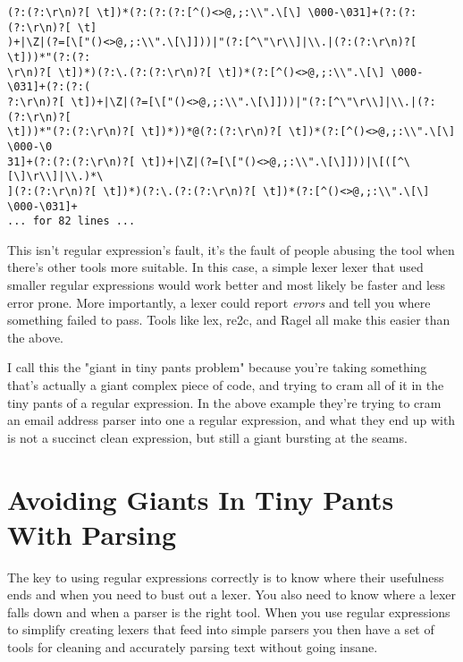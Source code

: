 \begin{lstlisting}
(?:(?:\r\n)?[ \t])*(?:(?:(?:[^()<>@,;:\\".\[\] \000-\031]+(?:(?:(?:\r\n)?[ \t]
)+|\Z|(?=[\["()<>@,;:\\".\[\]]))|"(?:[^\"\r\\]|\\.|(?:(?:\r\n)?[ \t]))*"(?:(?:
\r\n)?[ \t])*)(?:\.(?:(?:\r\n)?[ \t])*(?:[^()<>@,;:\\".\[\] \000-\031]+(?:(?:(
?:\r\n)?[ \t])+|\Z|(?=[\["()<>@,;:\\".\[\]]))|"(?:[^\"\r\\]|\\.|(?:(?:\r\n)?[ 
\t]))*"(?:(?:\r\n)?[ \t])*))*@(?:(?:\r\n)?[ \t])*(?:[^()<>@,;:\\".\[\] \000-\0
31]+(?:(?:(?:\r\n)?[ \t])+|\Z|(?=[\["()<>@,;:\\".\[\]]))|\[([^\[\]\r\\]|\\.)*\
](?:(?:\r\n)?[ \t])*)(?:\.(?:(?:\r\n)?[ \t])*(?:[^()<>@,;:\\".\[\] \000-\031]+
... for 82 lines ...
\end{lstlisting}

This isn't regular expression's fault, it's the fault of people abusing the
tool when there's other tools more suitable.  In this case, a simple lexer
lexer that used smaller regular expressions would work better and most likely
be faster and less error prone.  More importantly, a lexer could report
\emph{errors} and tell you where something failed to pass.  Tools like lex,
re2c, and Ragel all make this easier than the above.

I call this the "giant in tiny pants problem" because you're taking something
that's actually a giant complex piece of code, and trying to cram all of it
in the tiny pants of a regular expression.  In the above example they're trying
to cram an email address parser into one a regular expression, and what they
end up with is not a succinct clean expression, but still a giant bursting at
the seams.

\section{Avoiding Giants In Tiny Pants With Parsing}

The key to using regular expressions correctly is to know where their
usefulness ends and when you need to bust out a lexer.  You also need to know
where a lexer falls down and when a parser is the right tool.  When you
use regular expressions to simplify creating lexers that feed into simple
parsers you then have a set of tools for cleaning and accurately parsing
text without going insane.

